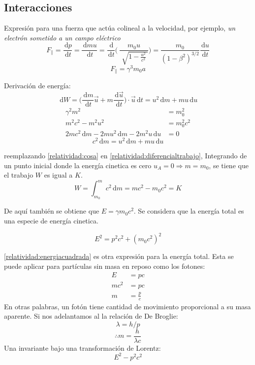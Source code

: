 \documentclass[10pt,twocolumn,titlepage]{article}
\newcommand{\inpar}[1]{\Bigg( #1 \Bigg)} %
\newcommand{\formu}[2]{ #1 $$#2$$ \par \vspace{.4cm} }%
\newcommand{\formuc}[2]{ #1 $$#2$$ } %
\newcommand{\di}{\,\textrm{d}}
\begin{document}
\subsection{Interacciones}


Expresión para una fuerza que actúa colineal a la velocidad, por ejemplo, \emph{un electrón sometido a un campo eléctrico}
$$F_{\parallel}=\frac{\di p}{\di t}=\frac{\di mu}{\di t}=\frac{\di }{\di t}\inpar{\:\frac{m_0u}{\sqrt[]{1-\frac{u^2}{c^2}\:}}}=\frac{m_0}{(1-\beta^2)^{3/2}}\frac{\di u}{\di t}$$
$$F_{\parallel}=\gamma^3m_0a $$


Derivación de energía:
\begin{equation} \label{relatividad:diferencialtrabajo}
\di W=\inpar{\frac{\di m}{\di t}\vec{u}+m\frac{\di \vec{u}}{\di t}}\cdot \vec{u}\di t=u^2\di m+mu\di u
\end{equation}
\begin{align*}
\gamma^2 m^2 &= m_0^2    \\
m^2c^2-m^2u^2&= m_0^2c^2 \\
2mc^2\di m-2mu^2\di m-2m^2u\di u &= 0 
\end{align*}
\begin{equation} \label{relatividad:cosa}
c^2\di m=u^2\di m+mu\di u
\end{equation}

reemplazando \ref{relatividad:cosa} en \ref{relatividad:diferencialtrabajo},
\formuc{Integrando de un punto inicial donde la energía cinetica es cero $u_A=0 \Rightarrow m=m_0$, se tiene que el trabajo $W$ es igual a $K$.}{ W=\int_{m_0}^{m}c^2\di m=mc^2-m_0c^2=K}
{De aquí también se obtiene que $E=\gamma m_0c^2$. Se considera que la energía total es una especie de energía cinetica.
\par \vspace{.3cm}}
\begin{equation} \label{relatividad:energiacuadrada}
E^2=p^2c^2+(m_0c^2)^2
\end{equation}

\ref{relatividad:energiacuadrada} es otra expresión para la energía total. Esta se puede aplicar para partículas sin masa en reposo como los fotones:
\begin{align*}
E &= pc \\
mc^2&=pc \\
m&=\frac{p}{c}
\end{align*}
{En otras palabras, un fotón tiene cantidad de movimiento proporcional a su masa aparente. Si nos adelantamos al la relación de De Broglie:}
$$ \lambda=h/p$$
$$\therefore m=\frac{h}{\lambda c} $$
\formu{Una invariante bajo una transformación de Lorentz:}{E^2-p^2c^2}
\end{document}
